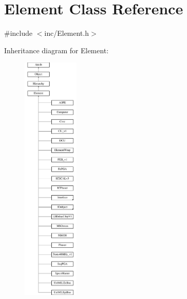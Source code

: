 \hypertarget{classElement}{}\section{Element Class Reference}
\label{classElement}


{\ttfamily \#include $<$inc/\+Element.\+h$>$}

Inheritance diagram for Element\+:\begin{figure}[H]
\begin{center}
\leavevmode
\includegraphics[height=12.000000cm]{classElement}
\end{center}
\end{figure}
